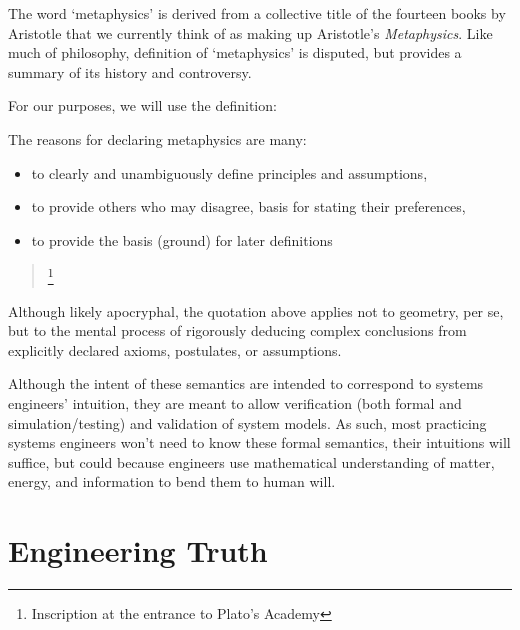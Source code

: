
\pn The word `metaphysics’ is derived from a collective title of the fourteen books by Aristotle that we currently think of as making up Aristotle’s \emph{Metaphysics}.  Like much of philosophy, definition of `metaphysics’ is disputed, but \cite{metaphysics} provides a summary of its history and controversy.

\pn For our purposes, we will use the definition:


\pn The reasons for declaring metaphysics are many:
\begin{itemize}
\item to clearly and unambiguously define principles and assumptions,
\item to provide others who may disagree, basis for stating their preferences,
\item to provide the basis (ground) for later definitions
\end{itemize}

\begin{quotation}
\footnote{Inscription at the entrance to Plato's Academy}
\end{quotation}

\pn Although likely apocryphal, the quotation above applies not to geometry, per se, but to the mental process of rigorously deducing complex conclusions from explicitly declared axioms, postulates, or assumptions.  

\pn Although the intent of these semantics are intended to correspond to systems engineers' intuition, they are meant to allow verification (both formal and simulation/testing) and validation of system models.
As such, most practicing systems engineers won't need to know these formal semantics, their intuitions will suffice, but could because
engineers use mathematical understanding of matter, energy, and information to bend them to human will.


\section{Engineering Truth}\label{sec:entruth}

